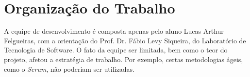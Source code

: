 \chapter{Organização do Trabalho}

A equipe de desenvolvimento é composta apenas pelo aluno Lucas Arthur Felgueiras, com a orientação do Prof. Dr. Fábio Levy Siqueira, do Laboratório de Tecnologia de Software. O fato da equipe ser limitada, bem como o teor do projeto, afetou a estratégia de trabalho. Por exemplo, certas metodologias ágeis, como o \textit{Scrum}, não poderiam ser utilizadas.

\begin{citacaoLonga}
  \blindtext
\end{citacaoLonga}

\blindtext
